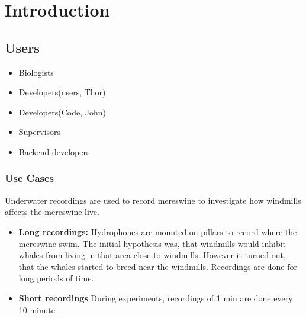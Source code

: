 \chapter{Introduction}

\section{Users}

\begin{itemize}
	\item Biologists
	\item Developers(users, Thor)
	\item Developers(Code, John)
	\item Supervisors
	\item Backend developers
\end{itemize}

\subsection{Use Cases}

Underwater recordings are used to record mereswine to investigate how windmills affects the mereswine live.
\begin{itemize}
	\item {\textbf{Long recordings:}}  Hydrophones are mounted on pillars to record where the mereswine swim. The initial hypothesis was, that windmills would inhibit whales from living in that area close to windmills. However it turned out, that the whales started to breed near the windmills. Recordings are done for long periods of time.
	
	\item {\textbf{Short recordings}} During experiments, recordings of 1 min are done every 10 minute.

\end{itemize}




